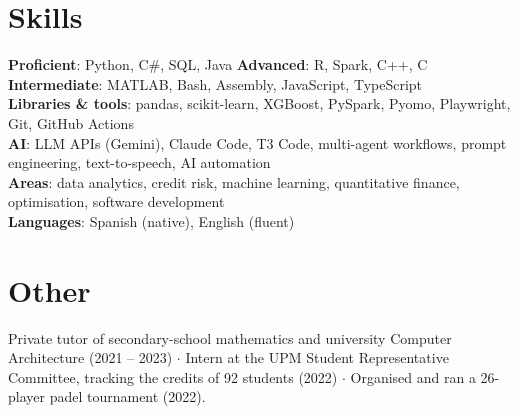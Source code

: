 \section{Skills}
 \begin{itemize}[leftmargin=0.15in, label={}]
    \small{\item{
     \textbf{Proficient}{: Python, C\#, SQL, Java} \quad \textbf{Advanced}{: R, Spark, C++, C} \quad \textbf{Intermediate}{: MATLAB, Bash, Assembly, JavaScript, TypeScript} \\
     \textbf{Libraries \& tools}{: pandas, scikit-learn, XGBoost, PySpark, Pyomo, Playwright, Git, GitHub Actions} \\
     \textbf{AI}{: LLM APIs (Gemini), Claude Code, T3 Code, multi-agent workflows, prompt engineering, text-to-speech, AI automation} \\
     \textbf{Areas}{: data analytics, credit risk, machine learning, quantitative finance, optimisation, software development} \\
     \textbf{Languages}{: Spanish (native), English (fluent)}
    }}
 \end{itemize}

\section{Other}
 \begin{itemize}[leftmargin=0.15in, label={}]
    \small{\item{
     Private tutor of secondary-school mathematics and university Computer Architecture (2021 -- 2023) $\cdot$
     Intern at the UPM Student Representative Committee, tracking the credits of 92 students (2022) $\cdot$
     Organised and ran a 26-player padel tournament (2022).
    }}
 \end{itemize}


